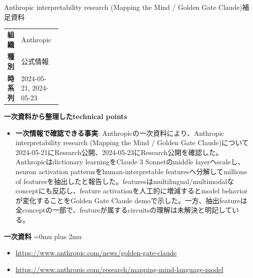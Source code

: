 \Needspace{0.38\textheight}
\begin{technicalnote}{Anthropic interpretability research (Mapping the Mind / Golden Gate Claude)}{補足資料}
\begingroup
\begin{tabularx}{\linewidth}{@{}>{\bfseries}p{0.22\linewidth}X@{}}
組織 & Anthropic \\
種別 & 公式情報 \\
時系列 & 2024-05-21, 2024-05-23 \\
\end{tabularx}
\smallskip
{\bfseries 一次資料から整理したtechnical points}
\begin{itemize}[leftmargin=1.5em,itemsep=0.35em]
\item \textbf{一次情報で確認できる事実}: Anthropicの一次資料により、Anthropic interpretability research (Mapping the Mind / Golden Gate Claude)について2024-05-21にResearch公開、2024-05-23にResearch公開を確認した。 Anthropicはdictionary learningをClaude 3 Sonnetのmiddle layerへscaleし、neuron activation patternsをhuman-interpretable featuresへ分解してmillions of featuresを抽出したと報告した。featuresはmultilingual/multimodalなconceptにも反応し、feature activationを人工的に増減するとmodel behaviorが変化することをGolden Gate Claude demoで示した。一方、抽出featureは全conceptの一部で、featureが属するcircuitsの理解は未解決と明記している。
\end{itemize}
\begin{minipage}{\linewidth}
\begin{samepage}
{\bfseries 一次資料}
\begingroup\sloppy
\Urlmuskip=0mu plus 2mu\relax
\begin{itemize}[leftmargin=1.5em,itemsep=0.25em]
\item {\scriptsize\url{https://www.anthropic.com/news/golden-gate-claude}}
\item {\scriptsize\url{https://www.anthropic.com/research/mapping-mind-language-model}}
\end{itemize}
\endgroup
\end{samepage}
\end{minipage}
\endgroup
\end{technicalnote}
\medskip

